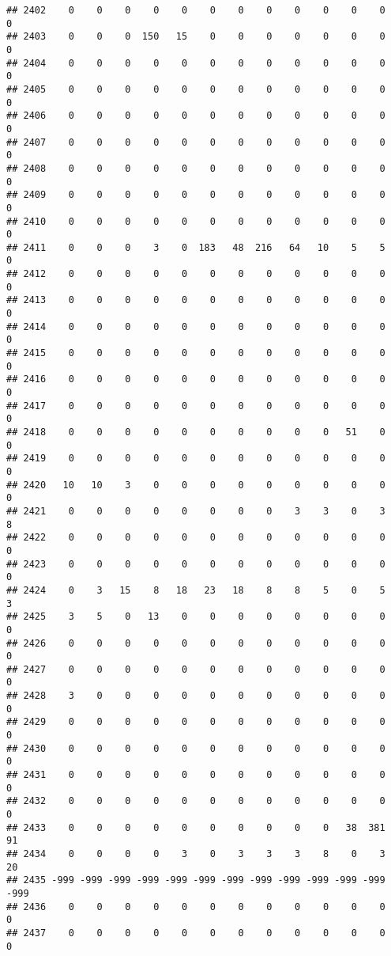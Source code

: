 \documentclass[]{article}
\begin{document}
\begin{verbatim}
## 2402    0    0    0    0    0    0    0    0    0    0    0    0    0
## 2403    0    0    0  150   15    0    0    0    0    0    0    0    0
## 2404    0    0    0    0    0    0    0    0    0    0    0    0    0
## 2405    0    0    0    0    0    0    0    0    0    0    0    0    0
## 2406    0    0    0    0    0    0    0    0    0    0    0    0    0
## 2407    0    0    0    0    0    0    0    0    0    0    0    0    0
## 2408    0    0    0    0    0    0    0    0    0    0    0    0    0
## 2409    0    0    0    0    0    0    0    0    0    0    0    0    0
## 2410    0    0    0    0    0    0    0    0    0    0    0    0    0
## 2411    0    0    0    3    0  183   48  216   64   10    5    5    0
## 2412    0    0    0    0    0    0    0    0    0    0    0    0    0
## 2413    0    0    0    0    0    0    0    0    0    0    0    0    0
## 2414    0    0    0    0    0    0    0    0    0    0    0    0    0
## 2415    0    0    0    0    0    0    0    0    0    0    0    0    0
## 2416    0    0    0    0    0    0    0    0    0    0    0    0    0
## 2417    0    0    0    0    0    0    0    0    0    0    0    0    0
## 2418    0    0    0    0    0    0    0    0    0    0   51    0    0
## 2419    0    0    0    0    0    0    0    0    0    0    0    0    0
## 2420   10   10    3    0    0    0    0    0    0    0    0    0    0
## 2421    0    0    0    0    0    0    0    0    3    3    0    3    8
## 2422    0    0    0    0    0    0    0    0    0    0    0    0    0
## 2423    0    0    0    0    0    0    0    0    0    0    0    0    0
## 2424    0    3   15    8   18   23   18    8    8    5    0    5    3
## 2425    3    5    0   13    0    0    0    0    0    0    0    0    0
## 2426    0    0    0    0    0    0    0    0    0    0    0    0    0
## 2427    0    0    0    0    0    0    0    0    0    0    0    0    0
## 2428    3    0    0    0    0    0    0    0    0    0    0    0    0
## 2429    0    0    0    0    0    0    0    0    0    0    0    0    0
## 2430    0    0    0    0    0    0    0    0    0    0    0    0    0
## 2431    0    0    0    0    0    0    0    0    0    0    0    0    0
## 2432    0    0    0    0    0    0    0    0    0    0    0    0    0
## 2433    0    0    0    0    0    0    0    0    0    0   38  381   91
## 2434    0    0    0    0    3    0    3    3    3    8    0    3   20
## 2435 -999 -999 -999 -999 -999 -999 -999 -999 -999 -999 -999 -999 -999
## 2436    0    0    0    0    0    0    0    0    0    0    0    0    0
## 2437    0    0    0    0    0    0    0    0    0    0    0    0    0

\end{verbatim}
\end{document}
